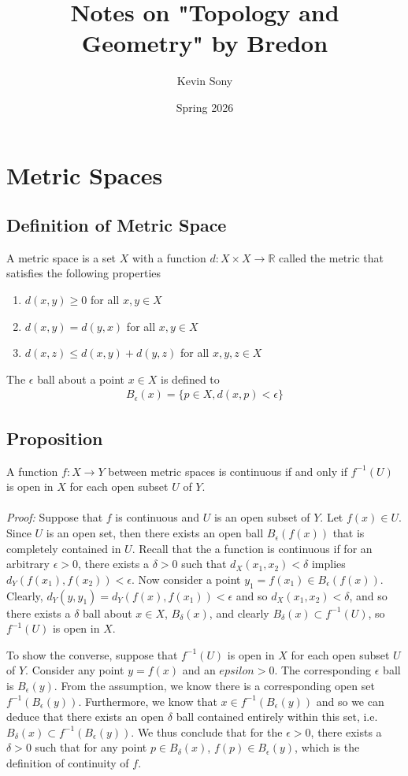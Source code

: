 \documentclass{article}
\title{Notes on "Topology and Geometry" by Bredon}
\author{Kevin Sony}
\date{Spring 2026}
\newcommand{\R}{\mathbb{R}}
\begin{document}
	
	\maketitle
	
	\section{Metric Spaces}
	
	\subsection{Definition of Metric Space}
	A metric space is a set $X$ with a function $d: X \times X \to \R$ called the metric that satisfies the following properties
	\begin{enumerate}
		\item $d(x, y) \geq 0$ for all $x, y \in X$
		\item $d(x, y) = d(y, x)$ for all $x, y \in X$
		\item $d(x, z) \leq d(x, y) + d(y, z)$ for all $x, y, z \in X$
	\end{enumerate}
	The $\epsilon$ ball about a point $x \in X$ is defined to 
	\begin{gather*}
		B_{\epsilon}(x) = \{ p \in X, d(x, p) < \epsilon \}
	\end{gather*}
	
	\subsection{Proposition}
	A function $f : X \to Y$ between metric spaces is continuous if and only if $f^{-1}(U)$ is open in $X$ for each open subset $U$ of $Y$.
	\\ \\
	\noindent \textit{Proof:}
	Suppose that $f$ is continuous and $U$ is an open subset of $Y$. Let $f(x) \in U$. Since $U$ is an open set, then there exists an open ball $B_{\epsilon}(f(x))$ that is completely contained in $U$. Recall that the a function is continuous if for an arbitrary $\epsilon > 0$, there exists a $\delta > 0$ such that $d_X(x_1, x_2) < \delta$ implies $d_Y(f(x_1), f(x_2)) < \epsilon$. Now consider a point $y_1 = f(x_1) \in B_{\epsilon}(f(x))$. Clearly, $d_Y(y, y_1) = d_Y(f(x), f(x_1)) < \epsilon$ and so $d_X(x_1, x_2) < \delta$, and so there exists a $\delta$ ball about $x \in X$, $B_{\delta}(x)$, and clearly $B_{\delta}(x) \subset f^{-1}(U)$, so $f^{-1}(U)$ is open in $X$.
	
	To show the converse, suppose that $f^{-1}(U)$ is open in $X$ for each open subset $U$ of $Y$. Consider any point $y = f(x)$ and an $epsilon > 0$. The corresponding $\epsilon$ ball is $B_{\epsilon}(y)$. From the assumption, we know there is a corresponding open set $f^{-1} (B_{\epsilon}(y))$. Furthermore, we know that $x \in f^{-1} (B_{\epsilon}(y))$ and so we can deduce that there exists an open $\delta$ ball contained entirely within this set, i.e. $B_{\delta}(x) \subset f^{-1} (B_{\epsilon}(y))$. We thus conclude that for the $\epsilon > 0$, there exists a $\delta > 0$ such that for any point $p \in B_{\delta}(x)$, $f(p) \in B_{\epsilon}(y)$, which is the definition of continuity of $f$.
	
\end{document}
